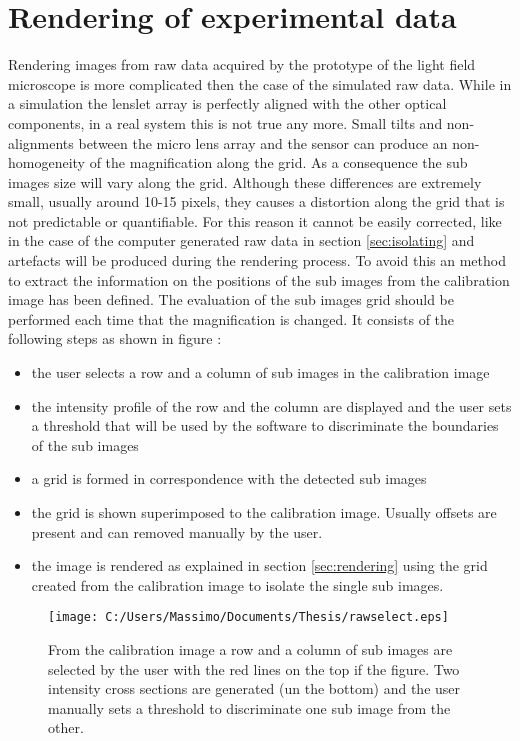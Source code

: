 \section{Rendering of experimental data}
Rendering images from raw data acquired by the prototype of the light field microscope is more complicated then the case of the simulated raw data. While in a simulation the lenslet array is perfectly aligned with the other optical components, in a real system this is not true any more. Small tilts and non-alignments between the micro lens array and the sensor can produce an non-homogeneity of the magnification along the grid. As a consequence the sub images size will vary along the grid. Although these differences are extremely small, usually around 10-15 pixels, they causes a distortion along the grid that is not predictable or quantifiable. For this reason it cannot be easily corrected, like in the case of the computer generated raw data in section \ref{sec:isolating} and artefacts will be produced during the rendering process. To avoid this an method to extract the information on the positions of the sub images from the calibration image has been defined. The evaluation of the sub images grid should be performed each time that the magnification is changed. It consists of the following steps as shown in figure :
\begin{itemize}
	\item the user selects a row and a column of sub images in the calibration image 
	\item the intensity profile of the row and the column are displayed and the user sets a threshold that will be used by the software to discriminate the boundaries of the sub images
	\item a grid is formed in correspondence with the detected sub images 
	\item the grid is shown superimposed to the calibration image. Usually offsets are present and can removed manually by the user.
	\item the image is rendered as explained in section \ref{sec:rendering} using the grid created from the calibration image to isolate the single sub images.
\end{itemize}
\begin{figure}[H]
	\centering
	\texttt{[image: C:/Users/Massimo/Documents/Thesis/rawselect.eps]}
	\caption{\label{fig:renderingreal} From the calibration image a row and a column of sub images are selected by the user with the red lines on the top if the figure. Two intensity cross sections are generated (un the bottom) and the user manually sets a threshold to discriminate one sub image from the other.}
\end{figure}
